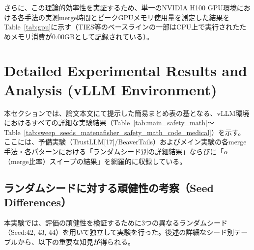 \documentclass{article}
\begin{document}
さらに、この理論的効率性を実証するため、単一のNVIDIA H100 GPU環境における各手法の実測merge時間とピークGPUメモリ使用量を測定した結果をTable~\ref{tab:gpu}に示す（TIES等のベースラインの一部はCPU上で実行されたためメモリ消費が0.00GBとして記録されている）。

\begin{table}[H]
\centering
\caption{各merge手法の実測merge時間とピークGPUメモリ(平均)}
\label{tab:gpu}
\small
{}
\end{table}

\FloatBarrier

\section{Detailed Experimental Results and Analysis (vLLM Environment)}
\label{sec:appendix_detailed_results}

本セクションでは、論文本文にて提示した簡易まとめ表の基となる、vLLM環境におけるすべての詳細な実験結果（Table~\ref{tab:main_safety_math}〜Table~\ref{tab:sweep_seeds_matenafisher_safety_math_code_medical}）を示す。ここには、予備実験（TrustLLM[17]/BeaverTails）およびメイン実験の各merge手法・各パターンにおける「ランダムシード別の詳細結果」ならびに「$\alpha$（merge比率）スイープの結果」を網羅的に収録している。

\subsection{ランダムシードに対する頑健性の考察（Seed Differences）}
本実験では、評価の頑健性を検証するために3つの異なるランダムシード（Seed:42, 43, 44）を用いて独立して実験を行った。後述の詳細なシード別テーブルから、以下の重要な知見が得られる。
\end{document}
